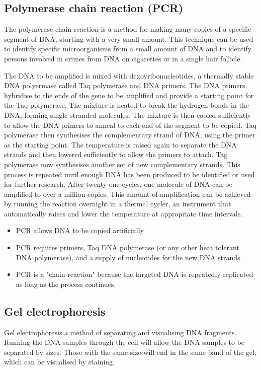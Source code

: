 \documentclass[11pt]{article}
\begin{document}
\newpage
\subsection{Polymerase chain reaction (PCR)}
\label{sec:orgf6d7f5a}
The polymerase chain reaction is a method for making many copies of a specific segment of DNA, starting with a very small amount. This technique can be used to identify specific microorganisms from a small amount of DNA and to identify persons involved in crimes from DNA on cigarettes or in a single hair follicle.


The DNA to be amplified is mixed with dexoyribonucleotides, a thermally stable DNA polyermase called Taq polymerase and DNA primers. The DNA primers hybridise to the ends of the gene to be amplified and provide a starting point for the Taq polymerase. The mixture is heated to break the hydrogen bonds in the DNA, forming single-stranded molecules. The mixture is then cooled sufficiently to allow the DNA primers to anneal to each end of the segment to be copied. Taq polymerase then synthesises the complementary strand of DNA, using the primer as the starting point. The temperature is raised again to separate the DNA strands and then lowered sufficiently to allow the primers to attach. Tag polymerase now synthesises another set of new complementary strands. This process is repeated until enough DNA has been produced to be identified or used for further research. After twenty-one cycles, one molecule of DNA can be amplified to over a million copies. This amount of amplification can be achieved by running the reaction overnight in a thermal cycler, an instrument that automatically raises and lower the temperature at appropriate time intervals.

\begin{itemize}
\item PCR allows DNA to be copied artificially
\item PCR requires primers, Taq DNA polymerase (or any other heat tolerant DNA polymerase), and a supply of nucleotides for the new DNA strands.
\item PCR is a "chain reaction" because the targeted DNA is repeatedly replicated as long as the process continues.
\end{itemize}
\subsection{Gel electrophoresis}
\label{sec:orgcc0a94f}
Gel electrophoresis a method of separating and visualising DNA fragments. Running the DNA samples through the cell will allow the DNA samples to be separated by sizes. Those with the same size will end in the same band of the gel, which can be visualised by staining.
\end{document}
